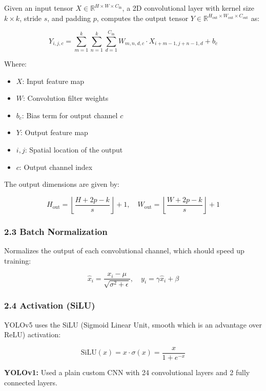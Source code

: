 \documentclass[11pt]{article}
\begin{document}
Given an input tensor \( X \in \mathbb{R}^{H \times W \times C_{\text{in}}} \), a 2D convolutional layer with kernel size \( k \times k \), stride \( s \), and padding \( p \), computes the output tensor \( Y \in \mathbb{R}^{H_{\text{out}} \times W_{\text{out}} \times C_{\text{out}}} \) as:

\[
Y_{i,j,c} = \sum_{m=1}^{k} \sum_{n=1}^{k} \sum_{d=1}^{C_{\text{in}}} W_{m,n,d,c} \cdot X_{i+m-1,j+n-1,d} + b_c
\]

Where:
\begin{itemize}
    \item \( X \): Input feature map
    \item \( W \): Convolution filter weights
    \item \( b_c \): Bias term for output channel \( c \)
    \item \( Y \): Output feature map
    \item \( i, j \): Spatial location of the output
    \item \( c \): Output channel index
\end{itemize}

The output dimensions are given by:

\[
H_{\text{out}} = \left\lfloor \frac{H + 2p - k}{s} \right\rfloor + 1, \quad
W_{\text{out}} = \left\lfloor \frac{W + 2p - k}{s} \right\rfloor + 1
\] \cite{dumoulin2016guide}

\subsubsection*{2.3 Batch Normalization}

Normalizes the output of each convolutional channel, which should speed up training:

\[
\hat{x}_i = \frac{x_i - \mu}{\sqrt{\sigma^2 + \epsilon}}, \quad y_i = \gamma \hat{x}_i + \beta
\] \cite{bochkovskiy2020yolov4}
\subsubsection*{2.4 Activation (SiLU)}

YOLOv5 uses the SiLU (Sigmoid Linear Unit, smooth which is an advantage over ReLU) activation:

\[
\text{SiLU}(x) = x \cdot \sigma(x) = \frac{x}{1 + e^{-x}}
\] \cite{bochkovskiy2020yolov4}


\textbf{YOLOv1:} Used a plain custom CNN with 24 convolutional layers and 2 fully connected layers.
\end{document}
